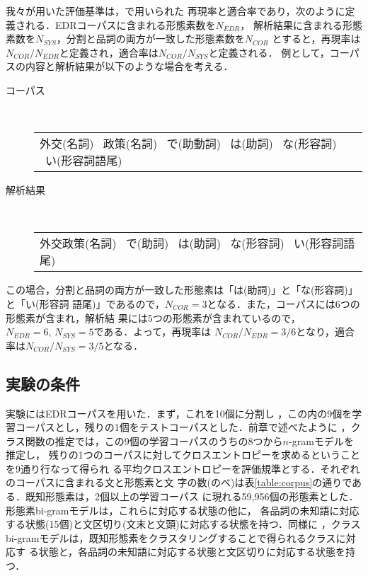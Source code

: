 我々が用いた評価基準は，\cite{EDRコーパスを用いた確率的日本語形態素解析}で用いられた
再現率と適合率であり，次のように定義される．EDRコーパスに含まれる形態素数を$N_{EDR}$，
解析結果に含まれる形態素数を$N_{SYS}$，分割と品詞の両方が一致した形態素数を$N_{COR}$
とすると，再現率は$N_{COR}/N_{EDR}$と定義され，適合率は$N_{COR}/N_{SYS}$と定義される．
例として，コーパスの内容と解析結果が以下のような場合を考える．
\begin{description}
\item[コーパス] \ \\
  \begin{tabular}{l}
    外交(名詞) \ 政策(名詞) \ で(助動詞) \ は(助詞) \ な(形容詞) \ い(形容詞語尾)
  \end{tabular}
\item[解析結果] \ \\
  \begin{tabular}{l}
    外交政策(名詞) \ で(助詞) \ は(助詞) \ な(形容詞) \ い(形容詞語尾)
  \end{tabular}
\end{description}
この場合，分割と品詞の両方が一致した形態素は「は(助詞)」と「な(形容詞)」と「い(形容詞
語尾)」であるので，$N_{COR}= 3$となる．また，コーパスには6つの形態素が含まれ，解析結
果には5つの形態素が含まれているので，$N_ {EDR}=6,\,N_{SYS}=5$である．よって，再現率は
$N_{COR}/N_{EDR}=3/6$となり，適合率は$N_{COR}/N_{SYS}= 3/5$となる．



\subsection{実験の条件}

実験にはEDRコーパス\cite{EDR.電子化辞書仕様説明書}を用いた．まず，これを10個に分割し
，この内の9個を学習コーパスとし，残りの1個をテストコーパスとした．前章で述べたように
，クラス関数の推定では，この9個の学習コーパスのうちの8つから$n$-gramモデルを推定し，
残りの1つのコーパスに対してクロスエントロピーを求めるということを9通り行なって得られ
る平均クロスエントロピーを評価規準とする．それぞれのコーパスに含まれる文と形態素と文
字の数(のべ)は表\ref{table:corpus}の通りである．既知形態素は，2個以上の学習コーパス
に現れる59,956個の形態素とした．形態素bi-gramモデルは，これらに対応する状態の他に，
各品詞の未知語に対応する状態(15個)と文区切り(文末と文頭)に対応する状態を持つ．同様に
，クラスbi-gramモデルは，既知形態素をクラスタリングすることで得られるクラスに対応す
る状態と，各品詞の未知語に対応する状態と文区切りに対応する状態を持つ．


